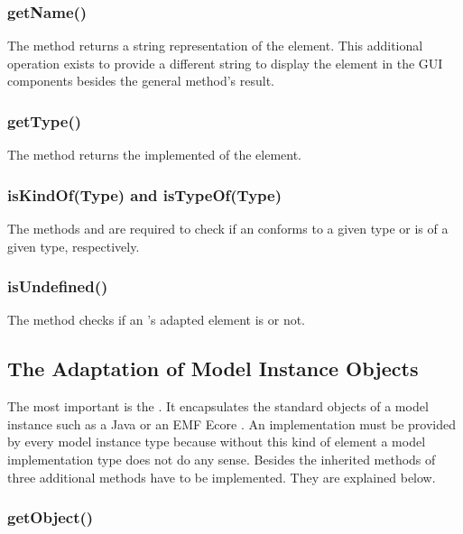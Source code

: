 \subsubsection{getName()}

The method  returns a string representation of the element. 
This additional operation exists to provide a different string to display the 
element in the \acs{GUI} components besides the general  
method's result.

\subsubsection{getType()}

The method  returns the implemented  of the element.

\subsubsection{isKindOf(Type) and isTypeOf(Type)}

The methods  and  are required to
check if an  conforms to a given type or is 
of a given type, respectively.

\subsubsection{isUndefined()}

The method  checks if an 's
adapted element is  or not.


\subsection{The Adaptation of Model Instance Objects}

The most important  is the
. It encapsulates the standard objects of a model 
instance such as a Java  or an \acs{EMF} Ecore . An
 implementation must be provided by every model
instance type because without this kind of element a model implementation type
does not do any sense. Besides the inherited methods of 
 three additional methods have to be implemented. 
They are explained below.

\subsubsection{getObject()}

